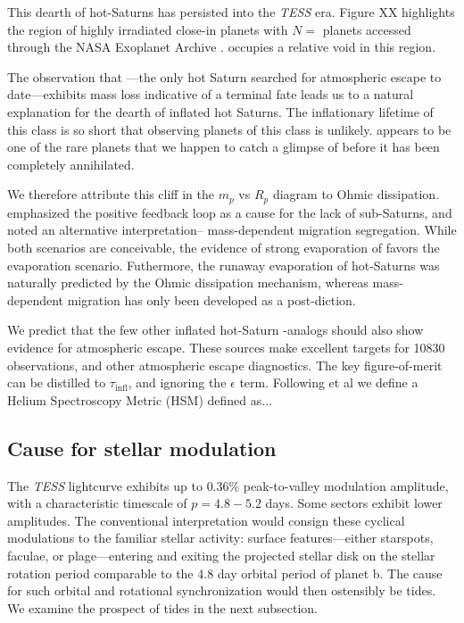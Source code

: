 \documentclass[twocolumn]{aastex631}
\newcommand{\hatpb}{\object{HAT-P-67 b}}
\begin{document}
This dearth of hot-Saturns has persisted into the \emph{TESS} era.  Figure XX highlights the region of highly irradiated close-in planets with $N=$ planets accessed through the NASA Exoplanet Archive .  \hatpb occupies a relative void in this region.

The observation that \hatpb---the only hot Saturn searched for atmospheric escape to date---exhibits mass loss indicative of a terminal fate leads us to a natural explanation for the dearth of inflated hot Saturns.  The inflationary lifetime of this class is so short that observing planets of this class is unlikely.  \hatpb appears to be one of the rare planets that we happen to catch a glimpse of before it has been completely annihilated.

We therefore attribute this cliff in the $m_p$ vs $R_p$ diagram to Ohmic dissipation.  \citet{2018AJ....155..214T} emphasized the positive feedback loop as a cause for the lack of sub-Saturns, and noted an alternative interpretation-- mass-dependent migration segregation.  While both scenarios are conceivable, the evidence of strong evaporation of \hatpb favors the evaporation scenario.  Futhermore, the runaway evaporation of hot-Saturns was naturally predicted by the Ohmic dissipation mechanism, whereas mass-dependent migration has only been developed as a post-diction.


We predict that the few other inflated hot-Saturn \hatpb-analogs should also show evidence for atmospheric escape.  These sources make excellent targets for  10830 observations, and other atmospheric escape diagnostics.  The key figure-of-merit can be distilled to $\tau_\mathrm{infl}$, and ignoring the $\epsilon$ term.  Following  et al we define a Helium Spectroscopy Metric (HSM) defined as...


\subsection{Cause for stellar modulation}
The \emph{TESS} lightcurve exhibits up to $0.36\%$ peak-to-valley modulation amplitude, with a characteristic timescale of $p=4.8-5.2$ days. Some sectors exhibit lower amplitudes.  The conventional interpretation would consign these cyclical modulations to the familiar stellar activity: surface features---either starspots, faculae, or plage---entering and exiting the projected stellar disk on the stellar rotation period comparable to the 4.8 day orbital period of planet b.  The cause for such orbital and rotational synchronization would then ostensibly be tides.  We examine the prospect of tides in the next subsection.
\end{document}
